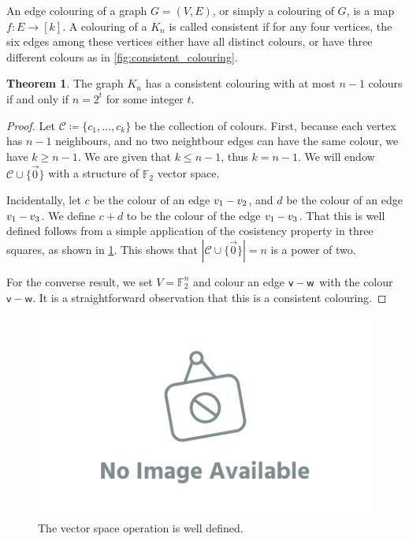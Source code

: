 \documentclass[12pt]{amsart}
\theoremstyle{definition}
\newtheorem{thm}{Theorem}[section]
\newcommand{\F}{\mathbb{F}}
\newcommand{\CC}{\mathcal C}
\newcommand{\vv}{\mathsf{v}}
\newcommand{\vw}{\mathsf{w}}
\begin{document}
An edge colouring of a graph $G = (V, E)$, or simply a colouring of $G$, is a map $f:E \to [k]$.
A colouring of a $K_n$ is called consistent if for any four vertices, the six edges among these vertices either have all distinct colours, or have three different colours as in \cref{fig:consistent_colouring}.



\begin{thm}
The graph $K_n$ has a consistent colouring with at most $n-1$ colours if and only if $n = 2^t $ for some integer $t$.
\end{thm}

\begin{proof}
Let $\CC \coloneqq\{ c_1, \dots, c_k\}$ be the collection of colours.
First, because each vertex has $n-1$ neighbours, and no two neightbour edges can have the same colour, we have $k \geq n-1$.
We are given that $k \leq n-1$, thus $k = n-1$. 
We will endow $\CC \cup \{\vec{0}\}$ with a structure of $\F_2$ vector space.

Incidentally, let $c$ be the colour of an edge $v_1 \-- v_2$, and $d$ be the colour of an edge $v_1 \-- v_3$.
We define $c + d $ to be the colour of the edge $v_1 \-- v_3$.
That this is well defined follows from a simple application of the cosistency property in three squares, as shown in \cref{fig:consistency_squares}.
This shows that $|\CC \cup \{\vec{0}\}| = n$ is a power of two.

For the converse result, we set $V = \F_2^n$ and colour an edge $\vv \-- \vw$ with the colour $\vv - \vw$.
It is a straightforward observation that this is a consistent colouring.
\end{proof}

\begin{figure}[h]
\includegraphics[scale=.1]{../imgs/ina.png}%
\caption{The vector space operation is well defined.\label{fig:consistency_squares}}
\end{figure}
\end{document}
